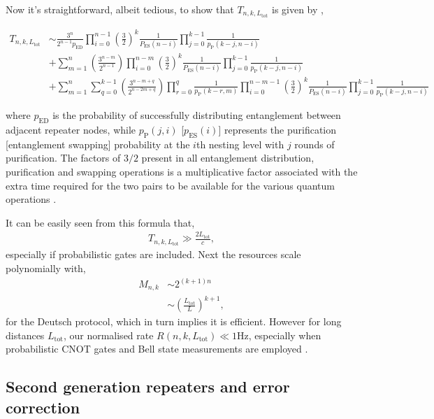 Now it's straightforward, albeit tedious, to show that $T_{n,k,L_\mathrm{tot}}$ is given by \cite{bib:braztzik2013},
\begin{widetext}
\begin{align*}
 T_{n,k,L_\mathrm{tot}} &\sim \frac{3^n}{2^{n-1} p_\mathrm{ED}} \prod_{i=0}^{n-1} \left(\frac{3}{2}\right)^{k}  \frac{1}{P_\mathrm{ES}(n-i)  }\prod_{j=0}^{k-1} \frac{1}{p_\mathrm{P}(k-j,n-i)}  \nonumber \\
 &+\sum_{m=1}^n\left(\frac{3^{n-m}}{2^{n-1}}\right) \prod_{i=0}^{n-m}   \left(\frac{3}{2}\right)^{k} \frac{1}{P_\mathrm{ES}(n-i)}  \prod_{j=0}^{k-1}  \frac{1}{p_\mathrm{P}(k-j,n-i)}  \\
&+\sum_{m=1}^n {\sum_{q=0}^{k-1} \left(\frac{3^{n-m+q}}{2^{n- 2 m+q}}\right) \prod_{r=0}^{q}\frac{1}{p_\mathrm{P}(k-r,m)}} 
\prod_{i=0}^{n-m-1}   \left(\frac{3}{2}\right)^{k} \frac{1}{P_\mathrm{ES}(n-i)}  \prod_{j=0}^{k-1}  \frac{1}{p_\mathrm{P}(k-j,n-i)} \nonumber 
\end{align*}
\end{widetext}
where $p_\mathrm{ED}$ is the probability of successfully distributing entanglement between adjacent repeater nodes, while $p_\mathrm{P}(j,i)$ [$p_\mathrm{ES}(i)$] represents the purification [entanglement swapping] probability at the $i$th nesting level with $j$ rounds of purification. The factors of $3/2$ present in all entanglement distribution, purification and swapping operations is a multiplicative factor associated with the extra time required for the two pairs to be available for the various quantum operations \cite{bib:SSRG09}.

It can be easily seen from this formula that,
\begin{align}
	T_{n,k,L_\mathrm{tot}} \gg \frac{2 L_\mathrm{tot}}{c},
\end{align}
especially if probabilistic gates are included. Next the resources scale polynomially with,
\begin{align}
	M_{n,k} &\sim 2^{(k+1)n}\nonumber\\
	&\sim \left(\frac{L_\mathrm{tot}}{L}\right)^{k+1},
\end{align}
for the Deutsch protocol, which in turn implies it is efficient. However for long distances $L_\mathrm{tot}$, our normalised rate \mbox{$R(n,k,L_\mathrm{tot})\ll 1\mathrm{Hz}$}, especially when probabilistic CNOT gates and Bell state measurements are employed \cite{bib:jiang09, munro10}.

\subsection{Second generation repeaters and error correction}

